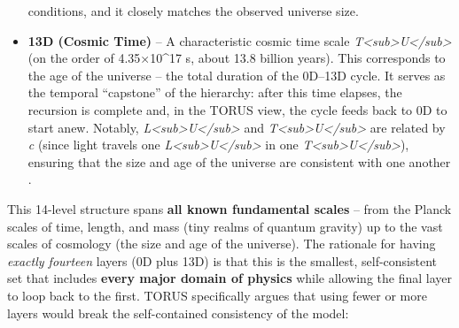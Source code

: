 \documentclass[]{article}
\begin{document}
\begin{itemize}
  conditions, and it closely matches the observed universe size.
\item
  \textbf{13D (Cosmic Time)} -- A characteristic cosmic time scale
  \emph{T\textless{}sub\textgreater{}U\textless{}/sub\textgreater{}} (on
  the order of 4.35×10\^{}17 s, about 13.8 billion years)​. This
  corresponds to the age of the universe -- the total duration of the
  0D--13D cycle. It serves as the temporal ``capstone'' of the
  hierarchy: after this time elapses, the recursion is complete and, in
  the TORUS view, the cycle feeds back to 0D to start anew. Notably,
  \emph{L\textless{}sub\textgreater{}U\textless{}/sub\textgreater{}} and
  \emph{T\textless{}sub\textgreater{}U\textless{}/sub\textgreater{}} are
  related by \emph{c} (since light travels one
  \emph{L\textless{}sub\textgreater{}U\textless{}/sub\textgreater{}} in
  one
  \emph{T\textless{}sub\textgreater{}U\textless{}/sub\textgreater{}}),
  ensuring that the size and age of the universe are consistent with one
  another​.
\end{itemize}

This 14-level structure spans \textbf{all known fundamental scales} --
from the Planck scales of time, length, and mass (tiny realms of quantum
gravity) up to the vast scales of cosmology (the size and age of the
universe)​. The rationale for having \emph{exactly fourteen} layers (0D
plus 13D) is that this is the smallest, self-consistent set that
includes \textbf{every major domain of physics} while allowing the final
layer to loop back to the first. TORUS specifically argues that using
fewer or more layers would break the self-contained consistency of the
model:
\end{document}
